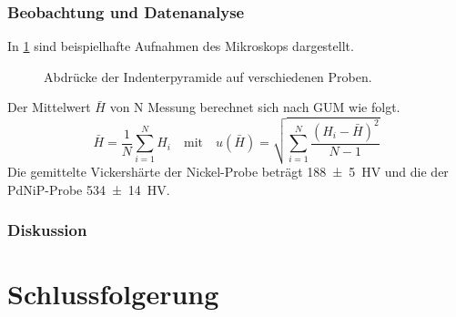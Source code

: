 \documentclass[
	a4paper,
	12pt,
	pagesize,
	ngerman
]{scrartcl}
\begin{document}
	\subsubsection{Beobachtung und Datenanalyse}
	In \cref{fig_indents} sind beispielhafte Aufnahmen des Mikroskops dargestellt.
	\begin{figure}[H]
		\centering

		 			
			\caption{Abdrücke der Indenterpyramide auf verschiedenen Proben.}
			\label{fig_indents}
 \end{figure}
 Der Mittelwert $\bar{H}$ von N Messung berechnet sich nach GUM wie folgt.
 \begin{equation}
	 \bar{H} = \frac{1}{N}\sum_{i=1}^N H_i \quad \text{mit} \quad u(\bar{H}) = \sqrt{\sum_{i=1}^N \frac{(H_i-\bar{H})^2}{N-1}}
 \end{equation}
 Die gemittelte Vickershärte der Nickel-Probe beträgt \SI{188+-5}{HV} und die der PdNiP-Probe \SI{534+-14}{HV}.

	\subsubsection{Diskussion}


	\section{Schlussfolgerung}

\end{document}
